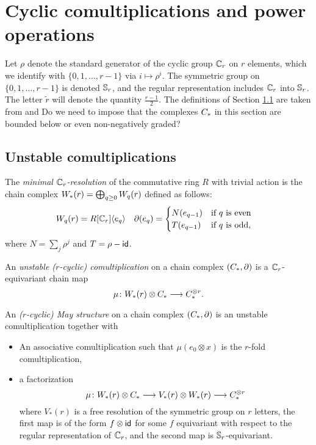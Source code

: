 \section{Cyclic comultiplications and power operations} \label{s:2bcomultiplications}

Let $\rho$ denote the standard generator of the cyclic group $\Cyc_r$ on $r$ elements, which we identify with $\{0,1,\ldots,r-1\}$ via $i\mapsto \rho^i$. The symmetric group on $\{0,1,\ldots,r-1\}$ is denoted $\Sym_r$, and the regular representation includes $\Cyc_r$ into $\Sym_r$. The letter $\tilde{r}$ will denote the quantity $\frac{r-1}{2}$. The definitions of Section \ref{s:unstable} are taken from \cite{may1970general} and \cite{medina2021may_st} \alert{Do we need to impose that the complexes $\ucadenas$ in this section are bounded below or even non-negatively graded?}

\subsection{Unstable comultiplications}\label{s:unstable}

The \emph{minimal $\Cyc_r$-resolution} of the commutative ring $R$ with trivial action is the chain complex $\W(r) = \bigoplus_{q\geq 0} \W[q](r)$ defined as follows:
\begin{align*}
	\W[q](r) &= R[\Cyc_r]\langle e_q\rangle  &
	\partial(e_q) &= \begin{cases}
		N(e_{q-1}) & \text{if $q$ is even} \\
		T(e_{q-1}) & \text{if $q$ is odd,}
	\end{cases}
\end{align*}
where $N = \sum_j \rho^j$ and $T = \rho - \Id$. 

\begin{definition} An \emph{unstable ($r$-cyclic) comultiplication} on a chain complex $(\ucadenas,\partial)$ is a $\Cyc_r$-equivariant chain map
\[\mu\colon \W(r)\otimes \ucadenas\lra \ucadenas^{\otimes r}.\]
\end{definition}

\begin{definition}
	An \emph{($r$-cyclic) May structure} on a chain complex $(\ucadenas,\partial)$ is an unstable comultiplication together with
	\begin{itemize}
		\item An associative comultiplication such that $\mu(e_0\otimes x)$ is the $r$-fold comultiplication,
		\item a factorization 
	\[
		\mu\colon \W(r)\otimes \ucadenas\lra V_*(r)\otimes \W(r)\lra  \ucadenas^{\otimes r}
	\]
where $V_*(r)$ is a free resolution of the symmetric group on $r$ letters, the first map is of the form $f\otimes \id$ for some $f$ equivariant with respect to the regular representation of $\Cyc_r$, and the second map is $\Sym_r$-equivariant.
	\end{itemize}
\end{definition}


